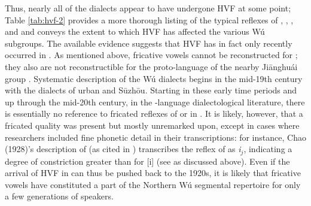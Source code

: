 \documentclass[output=paper,hidelinks]{langscibook}
\begin{document}
Thus, nearly all of the \THW{} dialects appear to have undergone HVF at some point; Table \ref{tab:hvf-2} provides a more thorough listing of the typical reflexes of  \pri{}, \prien{}, \pry{}, and \pryen{} and conveys the extent to which HVF has affected the various Wú subgroups.
%
The available evidence suggests that HVF has in fact only recently occurred in \THW{}.
%
As mentioned above, fricative vowels cannot be reconstructed for  \citep{ballard}; they also are not reconstructible for the proto-language of the nearby Ji\={a}nghu\'{a}i  group \citep{coblin}.
%
Systematic description of the Wú dialects begins in the mid-19th century with the dialects of urban \SH{} and S\={u}zh\={o}u. Starting in these early time periods and up through the mid-20th century, in the -language dialectological literature, there is essentially no reference to fricated reflexes of  \pri{} or \pry{} in \THW{} \citep{ting-suzhou, qian-change, chen-zm-diss}.
%
It is likely, however, that a fricated quality was present but mostly unremarked upon, except in cases where researchers included fine phonetic detail in their transcriptions: for instance, Chao (1928)’s description of  (as cited in \citealt{qian-change}) transcribes the reflex of \pri{} as \textit{i$_j$}, indicating a degree of constriction greater than for [i] (see \citealt{qian} as discussed above).
Even if the arrival of HVF in \THW{} can thus be pushed back to the 1920s, it is likely that fricative vowels have constituted a part of the Northern Wú segmental repertoire for only a few generations of speakers.
\end{document}
